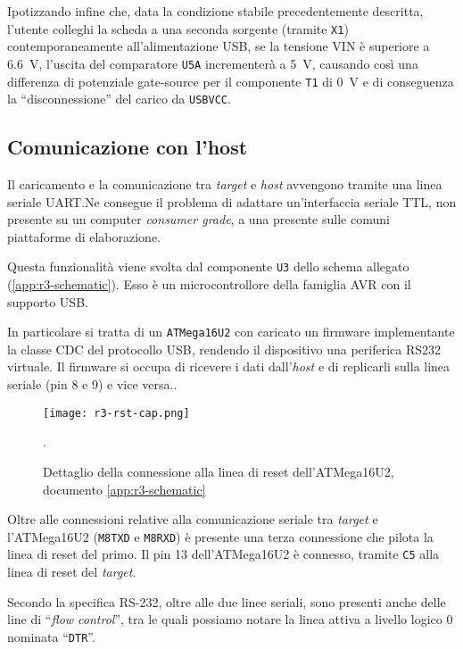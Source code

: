 Ipotizzando infine che, data la condizione stabile precedentemente descritta, l'utente colleghi la scheda a una seconda sorgente (tramite \texttt{X1}) contemporaneamente all'alimentazione USB, se la tensione VIN è superiore a \SI{6.6}{\volt}, l'uscita del comparatore \texttt{U5A} incrementerà a \SI{5}{\volt}, causando così una differenza di potenziale gate-source per il componente \texttt{T1} di \SI{0}{\volt} e di conseguenza la ``disconnessione'' del carico da \texttt{USBVCC}.

\subsection{Comunicazione con l'host}

Il caricamento e la comunicazione tra \textit{target} e \textit{host} avvengono tramite una linea seriale UART.\@ Ne consegue il problema di adattare un'interfaccia seriale TTL, non presente su un computer \textit{consumer grade}, a una presente sulle comuni piattaforme di elaborazione.

Questa funzionalità viene svolta dal componente \texttt{U3} dello schema allegato (\ref{app:r3-schematic}). Esso è un microcontrollore della famiglia AVR con il supporto USB.\@

In particolare si tratta di un \texttt{ATMega16U2} con caricato un firmware implementante la classe CDC del protocollo USB, rendendo il dispositivo una periferica RS232 virtuale.
Il firmware si occupa di ricevere i dati dall'\textit{host} e di replicarli sulla linea seriale (pin 8 e 9) e vice versa.\cite[firmwares/atmegaxxu2/arduino-usbserial/]{git:arduinocore}.

\begin{figure}[t]
    \centering
    \texttt{[image: r3-rst-cap.png]}
    \caption[Dettaglio dello schema elettronico posto in appendice, documento~\ref{app:r3-schematic}]{Dettaglio della connessione alla linea di reset dell'ATMega16U2, documento \ref{app:r3-schematic}~\cite{site:r3-schematic}}\label{fig:r3-schematic-rst-detail}.
\end{figure}


Oltre alle connessioni relative alla comunicazione seriale tra \textit{target} e l'ATMega16U2 (\texttt{M8TXD} e \texttt{M8RXD}) è presente una terza connessione che pilota la linea di reset del primo. Il pin 13 dell'ATMega16U2 è connesso, tramite \texttt{C5} alla linea di reset del \textit{target}.

Secondo la specifica RS-232, oltre alle due linee seriali, sono presenti anche delle line di ``\textit{flow control}'', tra le quali possiamo notare la linea attiva a livello logico 0 nominata ``\texttt{DTR}''.

